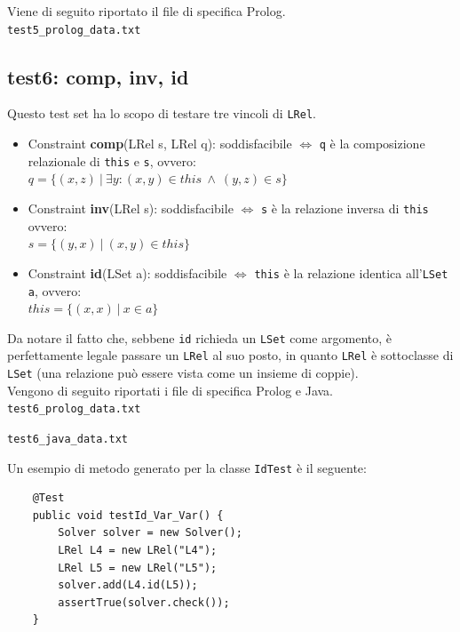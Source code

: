 Viene di seguito riportato il file di specifica Prolog.\\

\texttt{test5\_prolog\_data.txt}


%

\clearpage

\subsection{test6: comp, inv, id}
Questo test set ha lo scopo di testare tre vincoli di \texttt{LRel}.\\
\begin{itemize}
\item Constraint \textbf{comp}(LRel s, LRel q): soddisfacibile $\iff$ \texttt{q} è la composizione relazionale di \texttt{this} e \texttt{s}, ovvero:\\
 $q = \{ (x, z) \:| \: \exists y : (x, y) \in this \: \wedge \: (y, z) \in s \}$
\item Constraint \textbf{inv}(LRel s): soddisfacibile $\iff$ \texttt{s} è la relazione inversa di \texttt{this} ovvero:\\
 $s = \{ (y, x) \:| \: (x, y) \in this \}$
\item Constraint \textbf{id}(LSet a): soddisfacibile $\iff$ \texttt{this} è la relazione identica all'\texttt{LSet} \texttt{a}, ovvero:\\
 $this = \{(x, x) \:| \: x \in a \}$
\end{itemize}

Da notare il fatto che, sebbene \texttt{id} richieda un \texttt{LSet} come argomento, è perfettamente legale passare un \texttt{LRel} al suo posto, in quanto \texttt{LRel} è sottoclasse di \texttt{LSet} (una relazione può essere vista come un insieme di coppie).\\
Vengono di seguito riportati i file di specifica Prolog e Java.\\

\texttt{test6\_prolog\_data.txt}


\texttt{test6\_java\_data.txt}


Un esempio di metodo generato per la classe \texttt{IdTest} è il seguente:\\

\begin{lstlisting}
	@Test
	public void testId_Var_Var() {
		Solver solver = new Solver();
		LRel L4 = new LRel("L4");
		LRel L5 = new LRel("L5");
		solver.add(L4.id(L5));
		assertTrue(solver.check());
	}
\end{lstlisting}


